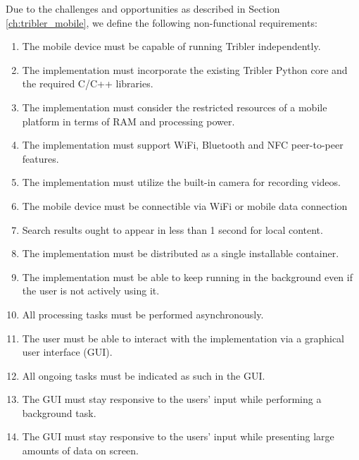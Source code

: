 Due to the challenges and opportunities as described in Section \ref{ch:tribler_mobile}, we define the following non-functional requirements:

\begin{enumerate}[label=B\arabic*.,ref=B\arabic*]
	
	\item \label{rq1}The mobile device must be capable of running Tribler independently.
	\item \label{rq2} The implementation must incorporate the existing Tribler Python core and the required C/C++ libraries.
	\item The implementation must consider the restricted resources of a mobile platform in terms of RAM and processing power.
	\item The implementation must support WiFi, Bluetooth and NFC peer-to-peer features.
	\item The implementation must utilize the built-in camera for recording videos.
	\item The mobile device must be connectible via WiFi or mobile data connection
	\item Search results ought to appear in less than 1 second for local content.
	\item The implementation must be distributed as a single installable container.
	\item The implementation must be able to keep running in the background even if the user is not actively using it.
	\item All processing tasks must be performed asynchronously.
	\item The user must be able to interact with the implementation via a graphical user interface (GUI).
	\item All ongoing tasks must be indicated as such in the GUI.
	\item The GUI must stay responsive to the users' input while performing a background task.
	\item The GUI must stay responsive to the users' input while presenting large amounts of data on screen.

\end{enumerate}
